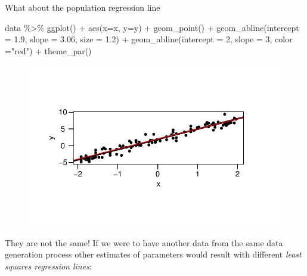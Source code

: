 \documentclass[
  letterpaper,
  DIV=11,
  numbers=noendperiod]{scrreprt}
\newenvironment{Shaded}{\begin{snugshade}}{\end{snugshade}}
\newcommand{\AttributeTok}[1]{\textcolor[rgb]{0.65,0.35,0.00}{#1}}
\newcommand{\DecValTok}[1]{\textcolor[rgb]{0.47,0.16,0.63}{#1}}
\newcommand{\FloatTok}[1]{\textcolor[rgb]{0.65,0.35,0.00}{#1}}
\newcommand{\FunctionTok}[1]{\textcolor[rgb]{0.02,0.16,0.49}{#1}}
\newcommand{\NormalTok}[1]{\textcolor[rgb]{0.33,0.33,0.33}{#1}}
\newcommand{\SpecialCharTok}[1]{\textcolor[rgb]{0.00,0.46,0.62}{#1}}
\newcommand{\StringTok}[1]{\textcolor[rgb]{0.00,0.50,0.00}{#1}}
\begin{document}
What about the population regression line

\begin{Shaded}
\begin{Highlighting}[]
\NormalTok{data }\SpecialCharTok{\%\textgreater{}\%} 
  \FunctionTok{ggplot}\NormalTok{() }\SpecialCharTok{+} \FunctionTok{aes}\NormalTok{(}\AttributeTok{x=}\NormalTok{x, }\AttributeTok{y=}\NormalTok{y) }\SpecialCharTok{+} \FunctionTok{geom\_point}\NormalTok{() }\SpecialCharTok{+} \FunctionTok{geom\_abline}\NormalTok{(}\AttributeTok{intercept =} \FloatTok{1.9}\NormalTok{, }\AttributeTok{slope =} \FloatTok{3.06}\NormalTok{, }\AttributeTok{size =} \FloatTok{1.2}\NormalTok{) }\SpecialCharTok{+} \FunctionTok{geom\_abline}\NormalTok{(}\AttributeTok{intercept =} \DecValTok{2}\NormalTok{, }\AttributeTok{slope =} \DecValTok{3}\NormalTok{, }\AttributeTok{color =}\StringTok{"red"}\NormalTok{) }\SpecialCharTok{+} \FunctionTok{theme\_par}\NormalTok{()}
\end{Highlighting}
\end{Shaded}

\begin{figure}[H]

{\centering \includegraphics{Chapter3_files/figure-pdf/unnamed-chunk-16-1.pdf}

}

\end{figure}

They are not the same! If we were to have another data from the same
data generation process other estimates of parameters would result with
different \emph{least squares regression lines}:
\end{document}
